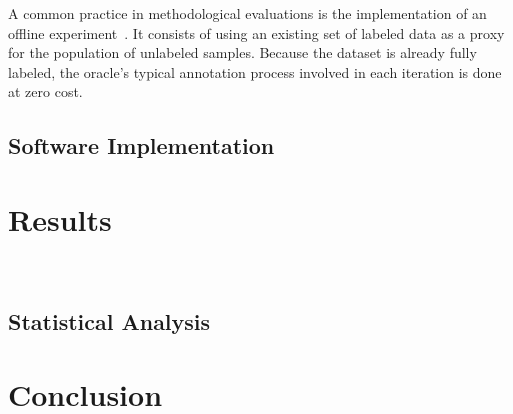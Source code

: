 \documentclass[parskip=full]{scrartcl}
\begin{document}
A common practice in methodological evaluations is the implementation of an offline
experiment~\cite{Kagy2019}. It consists of using an existing set of labeled data as a proxy for the
population of unlabeled samples. Because the dataset is already fully labeled, the oracle's typical
annotation process involved in each iteration is done at zero cost.



\subsection{Software Implementation}

\section{Results}~\label{sec:results}

\subsection{Statistical Analysis}

\section{Conclusion}~\label{sec:conclusion}



\end{document}
